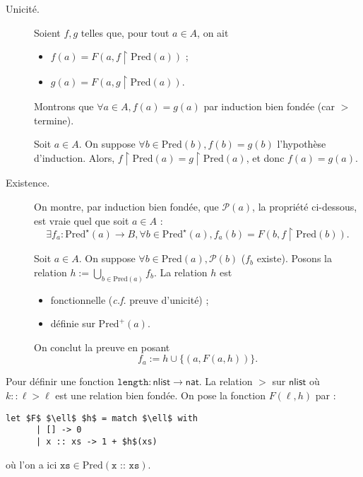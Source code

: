 \documentclass[../main]{subfiles}
\begin{document}
  \begin{prv}
    \begin{description}
      \item[Unicité.]
        Soient $f, g$ telles que, pour tout $a \in A$, on ait 
        \begin{itemize}
          \item $f(a) = F(a, f \upharpoonright \mathrm{Pred}(a))$ ;
          \item $g(a) = F(a, g \upharpoonright \mathrm{Pred}(a))$.
        \end{itemize}
        Montrons que $\forall a \in A, f(a) = g(a)$ par induction bien fondée (car $>$ termine).

        Soit $a \in A$. On suppose $\forall b \in \mathrm{Pred}(b), f(b) = g(b)$ l'hypothèse d'induction.
        Alors, $f \upharpoonright \mathrm{Pred}(a) = g \upharpoonright \mathrm{Pred}(a)$, et donc $f(a) = g(a)$.
      \item[Existence.]
        On montre, par induction bien fondée, que $\mathcal{P}(a)$, la propriété ci-dessous, est vraie quel que soit $a \in A$ :
        \[
        \exists  f_a : \mathrm{Pred}^\star(a) \to B, 
        \forall b \in \mathrm{Pred}^\star(a), f_a(b) = F(b, f \upharpoonright \mathrm{Pred}(b))
        .\] 

        Soit $a \in A$. On suppose $\forall b \in \mathrm{Pred}(a), \mathcal{P}(b)$ ($f_b$ existe).
        Posons la relation $h := \bigcup_{b \in \mathrm{Pred}(a)} f_b$.
        La relation $h$ est 
        \begin{itemize}
          \item fonctionnelle (\textit{c.f.} preuve d'unicité) ;
          \item définie sur $\mathrm{Pred}^+(a)$.
        \end{itemize}
        On conclut la preuve en posant \[
          f_a := h \cup \{(a, F(a, h))\} 
        .\]
    \end{description}
  \end{prv}

  \begin{exm}
    Pour définir une fonction $\mathtt{length} : \mathsf{nlist} \to \mathsf{nat}$.
    La relation $>$ sur $\mathsf{nlist}$ où $k :: \ell > \ell$ est une relation bien fondée.
    On pose la fonction $F(\ell, h)$ par :
    \begin{lstlisting}[language=caml,caption={Définition récursive bien fondée de $\mathtt{length}$}]
      let $F$ $\ell$ $h$ = match $\ell$ with
      | [] -> 0
      | x :: xs -> 1 + $h$(xs)
    \end{lstlisting}
    où l'on a ici $\mathtt{xs} \in \mathrm{Pred}(\texttt{x :: xs})$.
  \end{exm}
\end{document}

